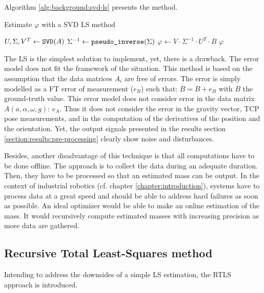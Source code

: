 \documentclass[/home/francois/latex/report/main.tex]{subfiles}
\begin{document}
Algorithm \ref{alg:background:svd-ls} presents the method.

\begin{algorithm}
\caption{Estimate $\varphi$ with a \ac{SVD} \ac{LS} method \label{alg:background:svd-ls}}
\begin{algorithmic}
\STATE $U, \Sigma, V^T \leftarrow \text{\texttt{SVD}}(A)$
\STATE $\Sigma^{-1} \leftarrow \text{\texttt{pseudo\_inverse}}(\Sigma)$
\STATE $\varphi \leftarrow V \cdot \Sigma^{-1} \cdot U^T \cdot B$
\RETURN $\varphi$
\end{algorithmic}
\end{algorithm}

The \ac{LS} is the simplest solution to implement, yet, there is a drawback. The error model does not fit the framework of the situation. This method is based on the assumption that the data matrices $A_i$ are free of errors. The error is simply modelled as a \ac{FT} error of measurement ($e_B$) such that: $\overline{B} = B + e_B$ with $\overline{B}$ the ground-truth value. This error model does not consider error in the data matrix $A(a, \alpha, \omega, g)$: $e_A$. Thus it does not consider the error in the gravity vector, \ac{TCP} pose measurements, and in the computation of the derivatives of the position and the orientation. Yet, the output signals presented in the results section \ref{section:results:pre-processing} clearly show noise and disturbances.

Besides, another disadvantage of this technique is that all computations have to be done offline. The approach is to collect the data during an adequate duration. Then, they have to be processed so that an estimated mass can be output. In the context of industrial robotics (cf. chapter \ref{chapter:introduction}), systems have to process data at a great speed and should be able to address hard failures as soon as possible. An ideal optimizer would be able to make an online estimation of the mass. It would recursively compute estimated masses with increasing precision as more data are gathered.

\subsection{Recursive Total Least-Squares method}

Intending to address the downsides of a simple \ac{LS} estimation, the \ac{RTLS} approach is introduced.
\end{document}
